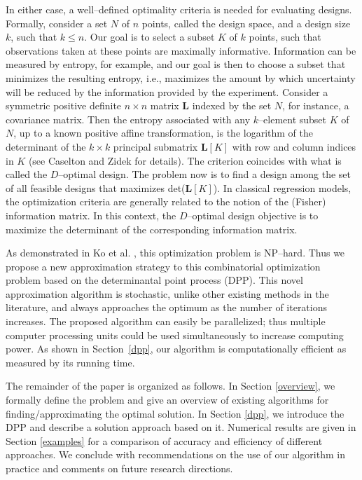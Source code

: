 \documentclass[]{interact}
\theoremstyle{plain}%
\theoremstyle{definition}
\theoremstyle{remark}
\newcommand{\matr}[1]{\bm{#1}}
\begin{document}
In either case, a well--defined optimality criteria is needed for evaluating designs. Formally, consider a set $N$ of $n$ points, called the design space, and a design size $k$, such that $k \leq n$. Our goal is to select a subset $K$ of $k$ points, such that observations taken at these points are maximally informative. Information can be measured by entropy, for example, and our goal is then to choose a subset that minimizes the resulting entropy, i.e., maximizes the amount by which uncertainty will be reduced by the information provided by the experiment. Consider a symmetric positive definite $n \times n$ matrix $\matr{L}$ indexed by the set $N$, for instance, a covariance matrix. Then the entropy associated with any $k$--element subset $K$ of $N$, up to a known positive affine transformation, is the logarithm of the determinant of the $k \times k$ principal submatrix $\matr{L}[K]$ with row and column indices in $K$ (see Caselton and Zidek \cite{CaseltonZidek} for details). The criterion coincides with what is called the $D$--optimal design. The problem now is to find a design among the set of all feasible designs that maximizes det($\matr{L}[K]$). In classical regression models, the optimization criteria are generally related to the notion of the (Fisher) information matrix. In this context, the $D$--optimal design objective is to maximize the determinant of the corresponding information matrix.

As demonstrated in Ko et al. \cite{KO1995}, this optimization problem is NP--hard.  Thus we propose a new approximation strategy to this combinatorial optimization problem based on the determinantal point process (DPP). This novel approximation algorithm is stochastic, unlike other existing methods in the literature, and always approaches the optimum as the number of iterations increases. The proposed algorithm can easily be parallelized; thus multiple computer processing units could be used simultaneously to increase computing power. As shown in Section~\ref{dpp}, our algorithm is computationally efficient as measured by its running time. 

The remainder of the paper is organized as follows. In Section \ref{overview}, we formally define the problem and give an overview of existing algorithms for finding/approximating the optimal solution. In Section \ref{dpp}, we introduce the DPP  and describe a solution approach based on it. Numerical results are given in Section \ref{examples} for a comparison of accuracy and efficiency of different approaches. We conclude with recommendations on the use of our algorithm in practice and comments on future research directions.
\end{document}
